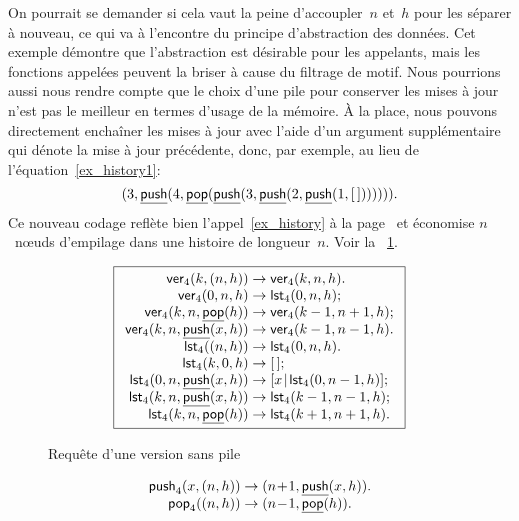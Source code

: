On pourrait se demander si cela vaut la peine d'accoupler~\(n\)
et~\(h\) pour les séparer à nouveau, ce qui va à l'encontre du
principe d'abstraction des données. Cet exemple démontre que
l'abstraction est désirable pour les appelants, mais les fonctions
appelées peuvent la briser à cause du filtrage de motif. Nous
pourrions aussi nous rendre compte que le choix d'une pile pour
conserver les mises à jour n'est pas le meilleur en termes d'usage de
la mémoire. À la place, nous pouvons directement enchaîner les mises à
jour avec l'aide d'un argument supplémentaire qui dénote la mise à
jour précédente, donc, par exemple, au lieu de
l'équation~\eqref{ex_history1}:
\begin{equation*}
({3},{\underline{\textsf{push}}(4, \underline{\textsf{pop}}(\underline{\textsf{push}}(3, \underline{\textsf{push}}(2, \underline{\textsf{push}}(1,[\,])))))}).
\end{equation*}
Ce nouveau codage reflète
bien l'appel~\eqref{ex_history} à la page~\pageref{ex_history} et
économise \(n\)~nœuds d'empilage dans une histoire de
longueur~\(n\). Voir la \fig~\ref{fig:ver}.
\begin{figure}
\begin{equation*}
\boxed{%
\begin{array}{r@{\;}l@{\;}l}
\fun{ver}_4(k,\pair{n}{h}) & \rightarrow & \fun{ver}_4(k,n,h).\\
\fun{ver}_4(0,n,h) & \rightarrow & \fun{lst}_4(0,n,h);\\
\fun{ver}_4(k,n,\ufun{pop}(h))
                      & \rightarrow & \fun{ver}_4(k-1,n+1,h);\\
\fun{ver}_4(k,n,\ufun{push}(x,h))
                      & \rightarrow & \fun{ver}_4(k-1,n-1,h).\\
\fun{lst}_4(\pair{n}{h}) & \rightarrow & \fun{lst}_4(0,n,h).\\
\fun{lst}_4(k,0,h) & \rightarrow & \el;\\
\fun{lst}_4(0,n,\ufun{push}(x,h)) & \rightarrow
                      & \cons{x}{\fun{lst}_4(0,n-1,h)};\\
\fun{lst}_4(k,n,\ufun{push}(x,h)) & \rightarrow
                      & \fun{lst}_4(k-1,n-1,h);\\
\fun{lst}_4(k,n,\ufun{pop}(h)) & \rightarrow
                      & \fun{lst}_4(k+1,n+1,h).
\end{array}}
\end{equation*}
\caption{Requête d'une version sans pile}
\label{fig:ver}
\end{figure}
\begin{equation*}
\begin{array}{@{}r@{\;}l@{\;}l@{}}
\fun{push}_4(x,\pair{n}{h}) & \rightarrow &
\pair{n\!+\!1}{\ufun{push}(x,h)}.\\
\fun{pop}_4(\pair{n}{h}) & \rightarrow &
\pair{n\!-\!1}{\ufun{pop}(h)}.
\end{array}
\end{equation*}

